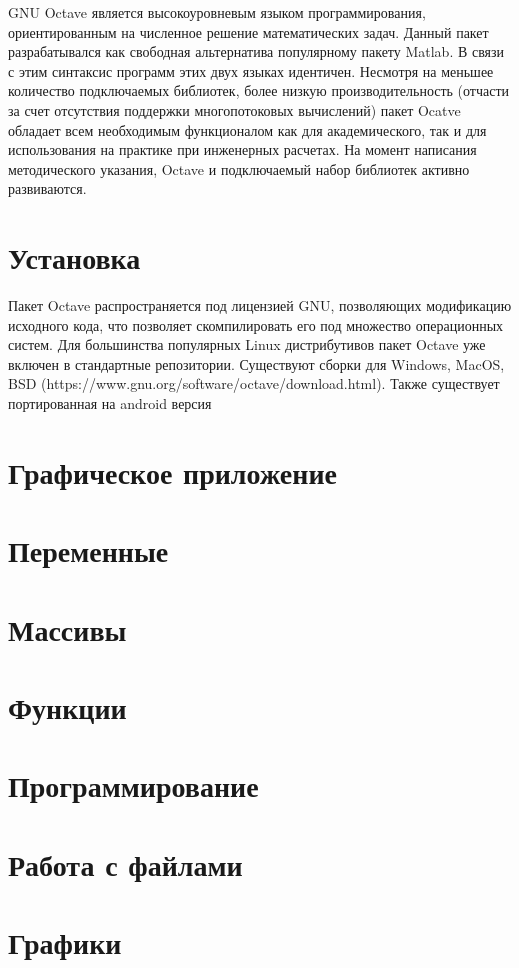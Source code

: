 
GNU Octave является высокоуровневым языком программирования, ориентированным на численное решение математических задач. Данный пакет разрабатывался как свободная альтернатива популярному пакету Matlab. В связи с этим синтаксис программ этих двух языках идентичен. Несмотря на меньшее количество подключаемых библиотек, более низкую производительность (отчасти за счет отсутствия поддержки многопотоковых вычислений) пакет Ocatve обладает всем необходимым функционалом как для академического, так и для использования на практике при инженерных расчетах.
На момент написания методического указания, Octave и подключаемый набор библиотек активно развиваются.

\section*{Установка}
Пакет Octave распространяется под лицензией GNU, позволяющих модификацию исходного кода, что позволяет скомпилировать его под множество операционных систем. Для большинства популярных Linux дистрибутивов пакет Octave уже включен в стандартные репозитории. Существуют сборки для Windows, MacOS, BSD (https://www.gnu.org/software/octave/download.html). Также существует портированная на android версия  

\section*{Графическое приложение}



\section*{Переменные}

\section*{Массивы}

\section*{Функции}

\section*{Программирование}

\section*{Работа с файлами}

\section*{Графики}

